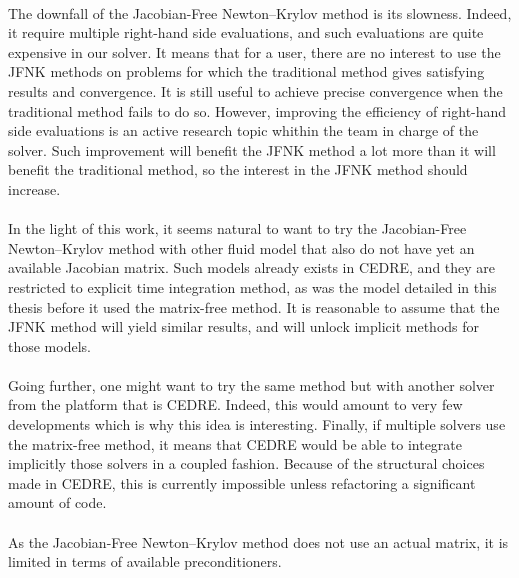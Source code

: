     \paragraph{}
    The downfall of the Jacobian-Free Newton--Krylov method is its slowness.
    Indeed, it require multiple right-hand side evaluations, and such evaluations are quite expensive in our solver.
    It means that for a user, there are no interest to use the JFNK methods on problems for which the traditional method gives satisfying results and convergence.
    It is still useful to achieve precise convergence when the traditional method fails to do so.
    However, improving the efficiency of right-hand side evaluations is an active research topic whithin the team in charge of the solver.
    Such improvement will benefit the JFNK method a lot more than it will benefit the traditional method, so the interest in the JFNK method should increase.

    \paragraph{}
    In the light of this work, it seems natural to want to try the Jacobian-Free Newton--Krylov method with other fluid model that also do not have yet an available Jacobian matrix.
    Such models already exists in CEDRE, and they are restricted to explicit time integration method, as was the model detailed in this thesis before it used the matrix-free method.
    It is reasonable to assume that the JFNK method will yield similar results, and will unlock implicit methods for those models.

    \paragraph{}
    Going further, one might want to try the same method but with another solver from the platform that is CEDRE.
    Indeed, this would amount to very few developments which is why this idea is interesting.
    Finally, if multiple solvers use the matrix-free method, it means that CEDRE would be able to integrate implicitly those solvers in a coupled fashion.
    Because of the structural choices made in CEDRE, this is currently impossible unless refactoring a significant amount of code.

    \paragraph{}
    As the Jacobian-Free Newton--Krylov method does not use an actual matrix, it is limited in terms of available preconditioners.
    


